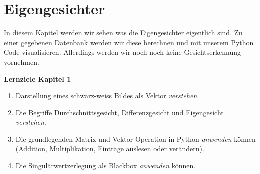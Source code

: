 \section{Eigengesichter}
In diesem Kapitel werden wir sehen was die Eigengesichter eigentlich sind.
Zu einer gegebenen Datenbank werden wir diese berechnen und mit unserem Python Code visualisieren.
Allerdings werden wir noch noch keine Gesichtserkennung vornehmen.
\begin{tcolorbox}
	\centerline{\textbf{Lernziele Kapitel 1}}
	\begin{enumerate}[leftmargin=*]
		\item Darstellung eines schwarz-weiss Bildes als Vektor \textit{verstehen}.
		\item Die Begriffe Durchschnittsgesicht, Differenzgesicht und Eigengesicht \textit{verstehen}.
		\item Die grundlegenden Matrix und Vektor Operation in Python \textit{anwenden} können (Addition, Multiplikation, Einträge auslesen oder verändern).
		\item Die Singulärwertzerlegung als Blackbox \textit{anwenden} können.
	\end{enumerate}
\end{tcolorbox}